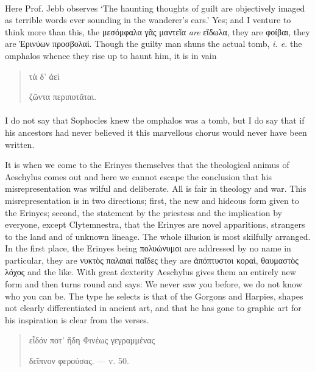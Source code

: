 \documentclass[a4paper, 11pt, oneside, polutonikogreek, english]{article}
\begin{document}
\paragraph{}
Here Prof. Jebb observes `The haunting thoughts of guilt are objectively imaged as terrible words ever sounding in the wanderer's ears.' Yes; and I venture to think more than this, the μεσόμφαλα γᾶς μαντεῖα \emph{are} εἴδωλα, they are φοίβαι, they are Ἐρινύων προσβολαί. Though the guilty man shuns the actual tomb, \emph{i. e.} the omphalos whence they rise up to haunt him, it is in vain
\begin{quotation}
\hspace*{20mm}τὰ δ' ἀεὶ

ζῶντα περιποτᾶται.
\end{quotation}
\paragraph{}
I do not say that Sophocles knew the omphalos was a tomb, but I do say that if his ancestors had never believed it this marvellous chorus would never have been written.

It is when we come to the Erinyes themselves that the theological animus of Aeschylus comes out and here we cannot escape the conclusion that his misrepresentation was wilful and deliberate. All is fair in theology and war. This misrepresentation is in two directions; first, the new and hideous form given to the Erinyes; second, the statement by the priestess and the implication by everyone, except Clytemnestra, that the Erinyes are novel apparitions, strangers to the land and of unknown lineage. The whole illusion is most skilfully arranged. In the first place, the Erinyes being πολυώνυμοι are addressed by no name in particular, they are νυκτὸς παλαιαὶ παῖδες they are ἀπόπτυστοι κοραὶ, θαυμαστὸς λόχος and the like. With great dexterity Aeschylus gives them an entirely new form and then turns round and says: We never saw you before, we do not know who you can be. The type he selects is that of the Gorgons and Harpies, shapes not clearly differentiated in ancient art, and that he has gone to graphic art for his inspiration is clear from the verses.
\begin{quotation}
εἶδόν ποτ' ἤδη Φινέως γεγραμμένας

δεῖπνον φερούσας. --- v. 50.
\end{quotation}
\end{document}
